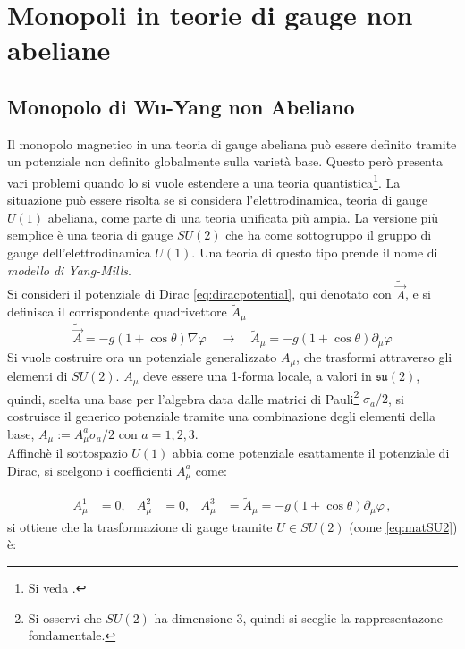 \chapter{Monopoli in teorie di gauge non abeliane}
%
\section{Monopolo di Wu-Yang non Abeliano}
Il monopolo magnetico in una teoria di gauge abeliana può essere definito tramite
un potenziale non definito globalmente sulla varietà base. Questo però presenta
vari problemi quando lo si vuole estendere a una teoria quantistica\footnote{
   Si veda \cite{nakahara}.
}.
La situazione può essere risolta se si considera l'elettrodinamica, teoria
di gauge $U(1)$ abeliana, come parte di una teoria unificata più ampia. La versione
più semplice è una teoria di gauge $SU(2)$ che ha come sottogruppo il gruppo
di gauge dell'elettrodinamica $U(1)$. Una teoria di questo tipo prende il nome
di \emph{modello di Yang-Mills}. \\

Si consideri il potenziale di Dirac \ref{eq:diracpotential}, qui denotato con
$\tilde{\vec A}$, e si definisca il corrispondente quadrivettore $\tilde{A}_\mu$
$$
   \tilde{\vec A} = -g(1 + \cos\theta) \nabla \varphi
   \quad \to \quad
   \tilde{A}_\mu = -g(1 + \cos\theta) \partial_\mu \varphi
$$
Si vuole costruire ora un potenziale generalizzato $A _\mu$, che trasformi attraverso
gli elementi di $SU(2)$.
$A_\mu$ deve essere una 1-forma locale, a valori in $\mathfrak{su(2)}$, quindi,
scelta una base per l'algebra data dalle matrici di Pauli\footnote{
   Si osservi che $SU(2)$ ha dimensione $3$, quindi si sceglie la rappresentazone
   fondamentale.
} $\sigma_a/2$, si costruisce il generico potenziale tramite una combinazione
degli elementi della base, $A_\mu := A_\mu^a \sigma_a/2$ con $a = 1,2,3$. \\
Affinchè il sottospazio $U(1)$ abbia come potenziale esattamente il potenziale
di Dirac, si scelgono i coefficienti $A_\mu^a$ come:

\begin{equation}\label{eq:wuyangpotential}
   \begin{aligned}
      A_\mu^1 &= 0, & A_\mu^2 &= 0, & A_\mu^3 &= \tilde{A}_\mu =
         -g(1 + \cos\theta) \partial_\mu \varphi \, ,
   \end{aligned}
\end{equation}
si ottiene che la trasformazione di gauge tramite $U \in SU(2)$ (come \ref{eq:matSU2})
è:

